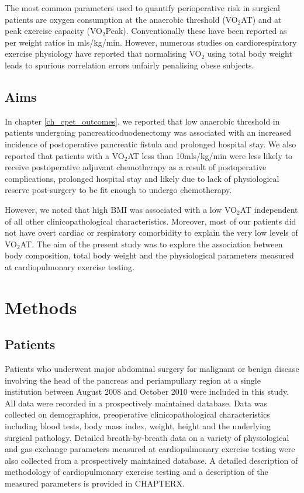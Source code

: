 The most common parameters used to quantify perioperative risk in surgical patients are oxygen consumption at the anaerobic threshold (VO$_2$AT) and at peak exercise capacity (VO$_2$Peak). Conventionally these have been reported as per weight ratios in mls/kg/min. However, numerous studies on cardiorespiratory exercise physiology have reported that normalising VO$_2$ using total body weight leads to spurious correlation errors unfairly penalising obese subjects.\parencite{seltzer_body_1940, tanner_fallacy_1949, toth_examination_1993, batterham_modeling_1999, goran_total_2000, krachler_cardiopulmonary_2014} 

\subsection{Aims}
In chapter \ref{ch_cpet_outcomes}, we reported that low anaerobic threshold in patients undergoing pancreaticoduodenectomy was associated with an increased incidence of postoperative pancreatic fistula and prolonged hospital stay. We also reported that patients with a VO$_2$AT less than 10mls/kg/min were less likely to receive postoperative adjuvant chemotherapy as a result of postoperative complications, prolonged hospital stay and likely due to lack of physiological reserve post-surgery to be fit enough to undergo chemotherapy.

However, we noted that high BMI was associated with a low VO$_2$AT independent of all other clinicopathological characteristics. Moreover, most of our patients did not have overt cardiac or respiratory comorbidity to explain the very low levels of VO$_2$AT.
The aim of the present study was to explore the association between body composition, total body weight and the physiological parameters measured at cardiopulmonary exercise testing.

\clearpage
\section{Methods}

\subsection{Patients}
Patients who underwent major abdominal surgery for malignant or benign disease involving the head of the pancreas and periampullary region at a single institution between August 2008 and October 2010 were included in this study. All data were recorded in a prospectively maintained database. Data was collected on demographics, preoperative clinicopathological characteristics including blood tests, body mass index, weight, height and the underlying surgical pathology. Detailed breath-by-breath data on a variety of physiological and gas-exchange parameters measured at cardiopulmonary exercise testing were also collected from a prospectively maintained database. A detailed description of methodology of cardiopulmonary exercise testing and a description of the measured parameters is provided in CHAPTERX.

